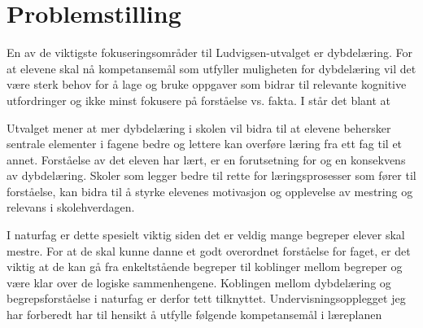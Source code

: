 \documentclass[main.tex]{subfiles}
\begin{document}
\section*{Problemstilling}
En av de viktigste fokuseringsområder til Ludvigsen-utvalget er dybdelæring. For at elevene
skal nå kompetansemål som utfyller muligheten for dybdelæring vil det være sterk behov for å lage og bruke 
oppgaver som bidrar til relevante kognitive utfordringer og ikke minst fokusere på forståelse vs. fakta. 
I  står det blant at

\begin{displayquote}
Utvalget mener at mer dybdelæring i skolen vil bidra til at elevene behersker sentrale elementer
i fagene bedre og lettere kan overføre læring fra ett fag til et annet. Forståelse av det eleven har
lært, er en forutsetning for og en konsekvens av dybdelæring. Skoler som legger bedre til rette for
læringsprosesser som fører til forståelse, kan bidra til å styrke elevenes motivasjon og opplevelse
av mestring og relevans i skolehverdagen.
\end{displayquote}
I naturfag er dette spesielt viktig siden det er veldig mange begreper elever skal mestre. For at de skal
kunne danne et godt overordnet forståelse for faget, er det viktig at de kan gå fra enkeltstående begreper til 
koblinger mellom begreper og være klar over de logiske sammenhengene. Koblingen mellom dybdelæring og 
begrepsforståelse i naturfag er derfor tett tilknyttet.
\newline
\newline
Undervisningsopplegget jeg har forberedt har til hensikt å utfylle følgende kompetansemål  i læreplanen
\end{document}

